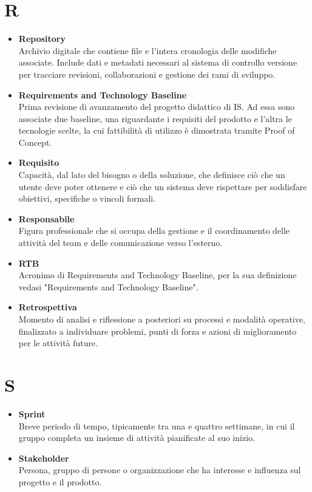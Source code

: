 \documentclass[a4paper,12pt]{article}
\begin{document}
        \section*{R} {
            \begin{itemize}
                \item \textbf{Repository}\\
                    Archivio digitale che contiene file e l'intera cronologia delle modifiche associate. Include dati e metadati necessari al sistema di controllo versione per tracciare revisioni, collaborazioni e gestione dei rami di sviluppo.
                \item \textbf{Requirements and Technology Baseline}\\
                    Prima revisione di avanzamento del progetto didattico di IS. Ad essa sono associate due baseline, una riguardante i requisiti del prodotto e l'altra le tecnologie scelte, la cui fattibilità di utilizzo è dimostrata tramite Proof of Concept.
                \item \textbf{Requisito}\\
                    Capacità, dal lato del bisogno o della soluzione, che definisce ciò che un utente deve poter ottenere e ciò che un sistema deve rispettare per soddisfare obiettivi, specifiche o vincoli formali.
                \item \textbf{Responsabile}\\
                    Figura professionale che si occupa della gestione e il coordinamento delle attività del team e delle comunicazione verso l'esterno.
                \item \textbf{RTB}\\
                    Acronimo di Requirements and Technology Baseline, per la sua definizione vedasi "Requirements and Technology Baseline".
                \item \textbf{Retrospettiva}\\
                    Momento di analisi e riflessione a posteriori su processi e modalità operative, finalizzato a individuare problemi, punti di forza e azioni di miglioramento per le attività future.
            \end{itemize}
        }
        \newpage

        \section*{S} {
            \begin{itemize}
                \item \textbf{Sprint}\\
                    Breve periodo di tempo, tipicamente tra una e quattro settimane, in cui il gruppo completa un insieme di attività pianificate al suo inizio.
                \item \textbf{Stakeholder}\\
                    Persona, gruppo di persone o organizzazione che ha interesse e influenza sul progetto e il prodotto.
            \end{itemize}
        }
        \newpage
\end{document}
